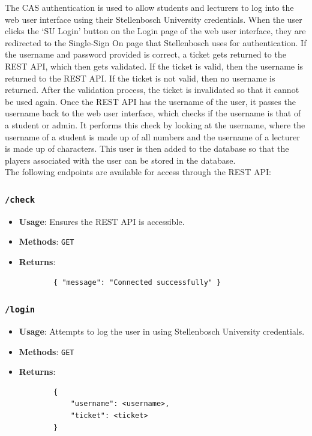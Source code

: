 \documentclass[a4paper, 12pt]{report}
\begin{document}
The CAS authentication is used to allow students and lecturers to log into the
web user interface using their Stellenbosch University credentials. When the
user clicks the `SU Login' button on the Login page of the web user interface,
they are redirected to the Single-Sign On page that Stellenbosch uses for
authentication. If the username and password provided is correct, a ticket gets
returned to the REST API, which then gets validated. If the ticket is valid, then
the username is returned to the REST API. If the ticket is not valid, then no
username is returned. After the validation process, the ticket is invalidated so
that it cannot be used again. Once the REST API has the username of the user,
it passes the username back to the web user interface, which checks if the username
is that of a student or admin. It performs this check by looking at the username,
where the username of a student is made up of all numbers and the username of
a lecturer is made up of characters. This user is then added to the database so
that the players associated with the user can be stored in the database. \\

The following endpoints are available for access through the REST API:
\subsubsection*{\texttt{/check}}
\begin{itemize}
	\item \textbf{Usage}: Ensures the REST API is accessible.
	\item \textbf{Methods}: \texttt{GET}
	\item \textbf{Returns}:
	\begin{verbatim}
		{ "message": "Connected successfully" }
	\end{verbatim}
\end{itemize}
\subsubsection*{\texttt{/login}}
\begin{itemize}
	\item \textbf{Usage}: Attempts to log the user in using Stellenbosch
	University credentials.
	\item \textbf{Methods}: \texttt{GET}
	\item \textbf{Returns}:
	\begin{verbatim}
		{
		    "username": <username>,
		    "ticket": <ticket>
		}
	\end{verbatim}
\end{itemize}
\end{document}
